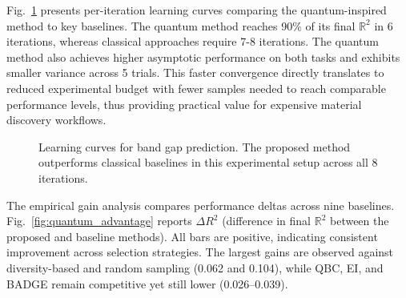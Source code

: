 \documentclass[conference]{IEEEtran}
\begin{document}
Fig.~\ref{fig:learning_curves} presents per-iteration learning curves comparing the quantum-inspired method to key baselines. The quantum method reaches 90\% of its final $\mathbb{R}^2$ in 6 iterations, whereas classical approaches require 7-8 iterations. The quantum method also achieves higher asymptotic performance on both tasks and exhibits smaller variance across 5 trials. This faster convergence directly translates to reduced experimental budget with fewer samples needed to reach comparable performance levels, thus providing practical value for expensive material discovery workflows.

\begin{figure}[!t]
\centering
{}
\caption{Learning curves for band gap prediction. The proposed method outperforms classical baselines in this experimental setup across all 8 iterations.}
\label{fig:learning_curves}
\end{figure}


The empirical gain analysis compares performance deltas across nine baselines. Fig.~\ref{fig:quantum_advantage} reports $\Delta R^2$ (difference in final $\mathbb{R}^2$ between the proposed and baseline methods). All bars are positive, indicating consistent improvement across selection strategies. The largest gains are observed against diversity-based and random sampling (0.062 and 0.104), while QBC, EI, and BADGE remain competitive yet still lower (0.026--0.039).
\end{document}
